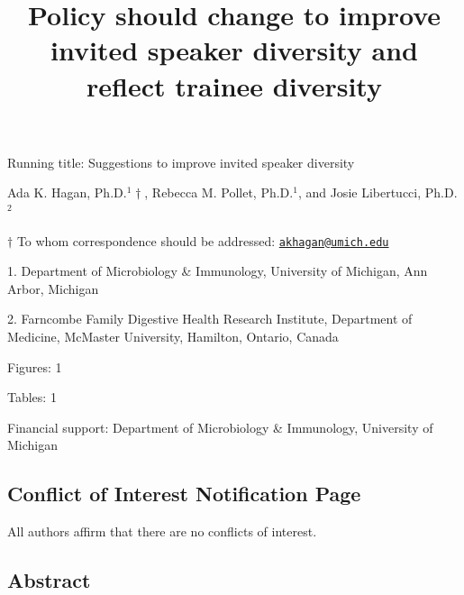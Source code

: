 \documentclass[10pt,]{article}
\title{\textbf{Policy should change to improve invited speaker diversity and
reflect trainee diversity}}
\author{}
\date{}
\begin{document}
\maketitle

\vspace{30mm}

Running title: Suggestions to improve invited speaker diversity

\vspace{35mm}

Ada K. Hagan, Ph.D.\({^1\dagger}\), Rebecca M. Pollet, Ph.D.\({^1}\),
and Josie Libertucci, Ph.D.\({^2}\)

\vspace{35mm}

\(\dagger\) To whom correspondence should be addressed:
\href{mailto:akhagan@umich.edu}{\nolinkurl{akhagan@umich.edu}}

1. Department of Microbiology \& Immunology, University of Michigan, Ann
Arbor, Michigan

2. Farncombe Family Digestive Health Research Institute, Department of
Medicine, McMaster University, Hamilton, Ontario, Canada

Figures: 1

Tables: 1

Financial support: Department of Microbiology \& Immunology, University
of Michigan

\newpage

\subsection{Conflict of Interest Notification
Page}\label{conflict-of-interest-notification-page}

\vspace{40mm}

All authors affirm that there are no conflicts of interest.

\newpage

\linenumbers

\subsection{Abstract}\label{abstract}
\end{document}

